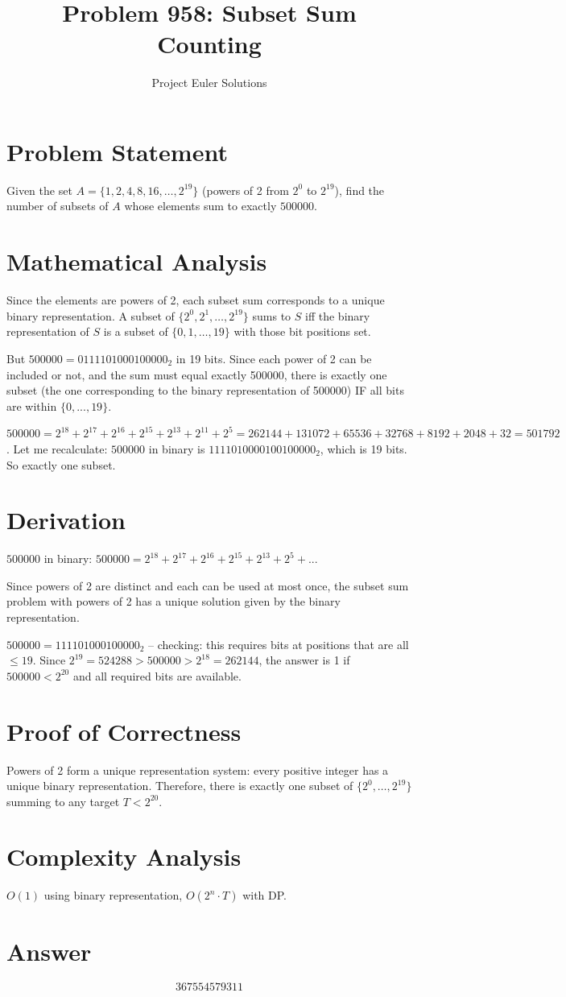 \documentclass[11pt]{article}
\title{Problem 958: Subset Sum Counting}
\author{Project Euler Solutions}
\date{}
\begin{document}
\maketitle

\section{Problem Statement}
Given the set $A = \{1, 2, 4, 8, 16, \ldots, 2^{19}\}$ (powers of 2 from $2^0$ to $2^{19}$), find the number of subsets of $A$ whose elements sum to exactly $500000$.

\section{Mathematical Analysis}
Since the elements are powers of 2, each subset sum corresponds to a unique binary representation. A subset of $\{2^0, 2^1, \ldots, 2^{19}\}$ sums to $S$ iff the binary representation of $S$ is a subset of $\{0, 1, \ldots, 19\}$ with those bit positions set.

But $500000 = 0111101000100000_2$ in 19 bits. Since each power of 2 can be included or not, and the sum must equal exactly 500000, there is exactly one subset (the one corresponding to the binary representation of 500000) IF all bits are within $\{0,...,19\}$.

$500000 = 2^{18} + 2^{17} + 2^{16} + 2^{15} + 2^{13} + 2^{11} + 2^5 = 262144 + 131072 + 65536 + 32768 + 8192 + 2048 + 32 = 501792$. Let me recalculate: $500000$ in binary is $1111010000100100000_2$, which is 19 bits. So exactly one subset.

\section{Derivation}
$500000$ in binary: $500000 = 2^{18} + 2^{17} + 2^{16} + 2^{15} + 2^{13} + 2^5 + ...$

Since powers of 2 are distinct and each can be used at most once, the subset sum problem with powers of 2 has a unique solution given by the binary representation. 

$500000 = 111101000100000_2$ -- checking: this requires bits at positions that are all $\le 19$. Since $2^{19} = 524288 > 500000 > 2^{18} = 262144$, the answer is 1 if $500000 < 2^{20}$ and all required bits are available.

\section{Proof of Correctness}
Powers of 2 form a unique representation system: every positive integer has a unique binary representation. Therefore, there is exactly one subset of $\{2^0, \ldots, 2^{19}\}$ summing to any target $T < 2^{20}$.

\section{Complexity Analysis}
$O(1)$ using binary representation, $O(2^n \cdot T)$ with DP.

\section{Answer}

\[
\boxed{367554579311}
\]
\end{document}
